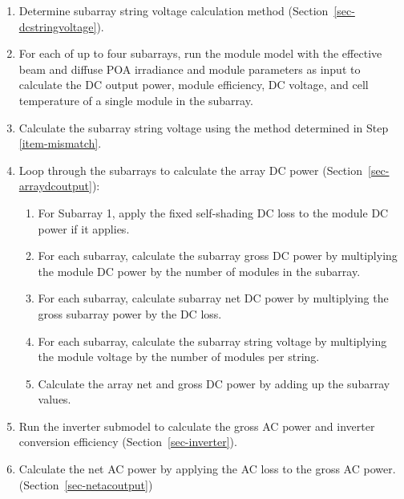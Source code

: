 \documentclass[12pt,letterpaper]{article}
\begin{document}
\begin{enumerate}
\item{Determine subarray string voltage calculation method (Section~\ref{sec-dcstringvoltage}).} \label{item-mismatch} %

\item{For each of up to four subarrays, run the module model with the effective beam and diffuse POA irradiance and module parameters as input to calculate the DC output power, module efficiency, DC voltage, and cell temperature of a single module in the subarray.} %

\item{Calculate the subarray string voltage using the method determined in Step \ref{item-mismatch}.} %

\item{Loop through the subarrays to calculate the array DC power (Section~\ref{sec-arraydcoutput}):} %

  \begin{enumerate}

  \item{For Subarray 1, apply the fixed self-shading DC loss to the module DC power if it applies.} %

  \item{For each subarray, calculate the subarray gross DC power by multiplying the module DC power by the number of modules in the subarray.} %

  \item{For each subarray, calculate subarray net DC power by multiplying the gross subarray power by the DC loss.} %

  \item{For each subarray, calculate the subarray string voltage by multiplying the module voltage by the number of modules per string.} %

  \item{Calculate the array net and gross DC power by adding up the subarray values.}

  \end{enumerate}

\item{Run the inverter submodel to calculate the gross AC power and inverter conversion efficiency (Section~\ref{sec-inverter}).} %


\item{Calculate the net AC power by applying the AC loss to the gross AC power. (Section~\ref{sec-netacoutput})} %

\end{enumerate}
\end{document}
